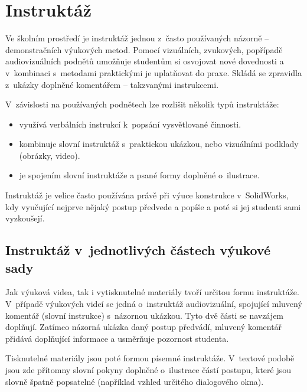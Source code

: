 \section{Instruktáž}
Ve školním prostředí je instruktáž jednou z~často používaných názorně -- demonstračních výukových metod.
Pomocí vizuálních, zvukových, popřípadě audiovizuálních podnětů umožňuje studentům si osvojovat nové dovednosti a v~kombinaci s~metodami praktickými je uplatňovat do praxe.
Skládá se zpravidla z~ukázky doplněné komentářem -- takzvanými instrukcemi.

\noindent V~závislosti na používaných podnětech lze rozlišit několik typů instruktáže:
\begin{itemize}[topsep=0pt]
    \setlength\itemsep{0em}
    \item {} využívá verbálních instrukcí k~popsání vysvětlované činnosti.
    \item {} kombinuje slovní instruktáž s~praktickou ukázkou, nebo vizuálními podklady (obrázky, video).
    \item {} je spojením slovní instruktáže a psané formy doplněné o~ilustrace.
\end{itemize}

Instruktáž je velice často používána právě při výuce konstrukce v~SolidWorks, kdy vyučující nejprve nějaký postup předvede a popíše a poté si jej studenti sami vyzkoušejí.

\subsection{Instruktáž v~jednotlivých částech výukové sady}
Jak výuková videa, tak i vytisknutelné materiály tvoří určitou formu instruktáže.
V~případě výukových videí se jedná o~instruktáž audiovizuální, spojující mluvený komentář (slovní instrukce) s~názornou ukázkou.
Tyto dvě části se navzájem doplňují.
Zatímco názorná ukázka daný postup předvádí, mluvený komentář přidává doplňující informace a usměrňuje pozornost studenta.

Tisknutelné materiály jsou poté formou písemné instruktáže.
V~textové podobě jsou zde přítomny slovní pokyny doplněné o~ilustrace částí postupu, které jsou slovně špatně popsatelné (například vzhled určitého dialogového okna).

\newpage